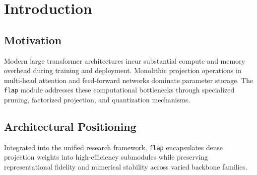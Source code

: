 \section{Introduction}

\subsection{Motivation}
Modern large transformer architectures incur substantial compute and memory overhead during training and deployment. Monolithic projection operations in multi-head attention and feed-forward networks dominate parameter storage. The \texttt{flap} module addresses these computational bottlenecks through specialized pruning, factorized projection, and quantization mechanisms.

\subsection{Architectural Positioning}
Integrated into the unified research framework, \texttt{flap} encapsulates dense projection weights into high-efficiency submodules while preserving representational fidelity and numerical stability across varied backbone families.
